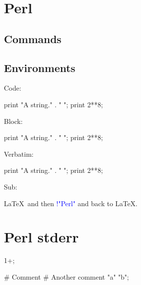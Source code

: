 \documentclass[11pt]{article}
\begin{document}
\section*{Perl}

\subsection*{Commands}




\printpythontex




\subsection*{Environments}

Code:
\begin{perlcode}
print "A string." . " ";
print 2**8;
\end{perlcode}

Block:
\begin{perlblock}
print "A string." . " ";
print 2**8;
\end{perlblock}

\printpythontex

Verbatim:
\begin{perlverbatim}
print "A string." . " ";
print 2**8;
\end{perlverbatim}

Sub:
\begin{perlsub}
\LaTeX\ and then \textcolor{blue}{!{"Perl"}} and back to \LaTeX.
\end{perlsub}


\section*{Perl stderr}



\stderrpythontex[][breaklines, breakafter=\\/]

\begin{perlblock}[err2][numbers=left]
1+;
\end{perlblock}

\stderrpythontex[][breaklines, breakafter=\\/]

\begin{perlblock}[err3][numbers=left]
# Comment
# Another comment
"a" "b";
\end{perlblock}

\stderrpythontex[][breaklines, breakafter=\\/]
\end{document}
